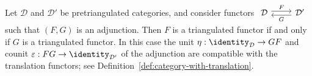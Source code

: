 \begin{proposition}\label{prop:adjoint-triangulated}
	Let $\mathcal{D}$ and $\mathcal{D}'$ be pretriangulated categories, and
	consider functors
	$\begin{tikzcd}
		\mathcal{D} \arrow[shift left, r, "F"] & \mathcal{D}' \arrow[shift left, l, "G"]
	\end{tikzcd}$
	such that $(F, G)$ is an adjunction. Then $F$ is a triangulated functor if
	and only if $G$ is a triangulated functor. In this case the unit
	$\eta: \identity_{\mathcal{D}} \to GF$ and counit
	$\varepsilon: FG \to \identity_{\mathcal{D}'}$ of the adjunction are
	compatible with the translation functors; see
	Definition~\ref{def:category-with-translation}.
\end{proposition}

